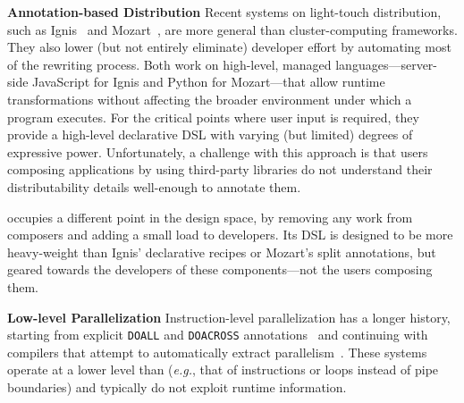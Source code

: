 \documentclass[sigplan,10pt,review,anonymous]{acmart}
\newcommand{\eg}{{\em e.g.}, }
\newcommand{\heading}[1]{\vspace{4pt}\noindent\textbf{#1}\enspace}
\newcommand{\ttt}[1]{\texttt{\small #1}}
\begin{document}


\heading{Annotation-based Distribution}
Recent systems on light-touch distribution, such as Ignis~\cite{ignis:19} and Mozart~\cite{mozart:19}, are more general than cluster-computing frameworks.
They also lower (but not entirely eliminate) developer effort by automating most of the rewriting process.
Both work on high-level, managed languages---server-side JavaScript for Ignis and Python for Mozart---that allow runtime transformations without affecting the broader environment under which a program executes.
For the critical points where user input is required, they provide a high-level declarative DSL with varying (but limited) degrees of expressive power.
Unfortunately, a challenge with this approach is that users composing applications by using third-party libraries do not understand their distributability details well-enough to annotate them.

\sys occupies a different point in the design space, by removing any work from composers and adding a small load to developers.
Its DSL is designed to be more heavy-weight than Ignis' declarative recipes or Mozart's split annotations, but geared towards the developers of these components---not the users composing them.



\heading{Low-level Parallelization}
Instruction-level parallelization has a longer history, starting from explicit \ttt{DOALL} and \ttt{DOACROSS} annotations~\cite{par1, par2} and continuing with compilers that attempt to automatically extract parallelism~\cite{padua1993polaris,hall1996maximizing}.
These systems operate at a lower level than \sys (\eg that of instructions or loops instead of pipe boundaries) and typically do not exploit runtime information.
\end{document}
